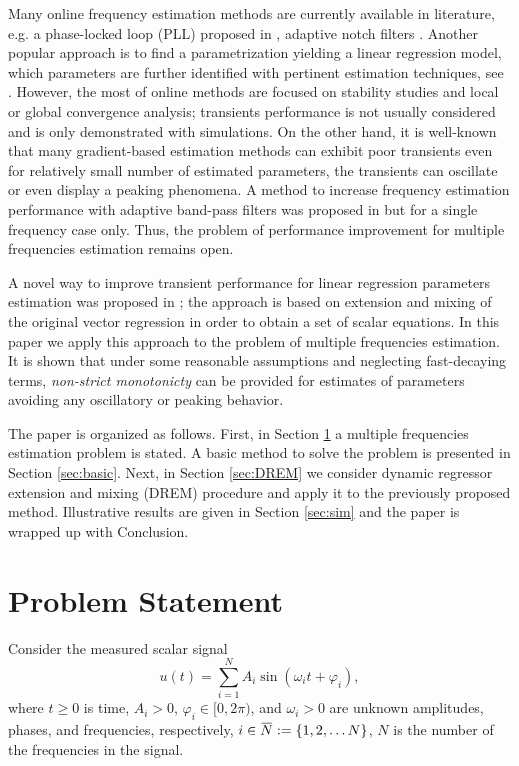 \documentclass[journal, onecolumn]{IEEEtran}
\newcommand{\overbar}[1]{\mkern 1.5mu\overline{\mkern-1.5mu#1\mkern-1.5mu}\mkern 1.5mu}
\newcommand{\iinb}{i\in\overbar{N}}
\begin{document}
Many online frequency estimation methods are currently available in literature, e.g. a phase-locked loop (PLL) proposed in \cite{wu2003magnitude}, adaptive notch filters \cite{regalia1991improved, mojiri2004adaptive}. Another popular approach is to find a parametrization yielding a linear regression model, which parameters are further identified with pertinent estimation techniques, see \cite{xia, chen2014robust, fedele2014frequency}. However, the most of online methods are focused on stability studies and local or global convergence analysis; transients performance is not usually considered and is only demonstrated with simulations. On the other hand, it is well-known that many gradient-based estimation methods can exhibit poor transients even for relatively small number of estimated parameters, the transients can oscillate or even display a peaking phenomena. A method to increase frequency estimation performance with adaptive band-pass filters was proposed in \cite{Aranovskiy2015Cascade} but for a single frequency case only. Thus, the problem of performance improvement for multiple frequencies estimation remains open.

A novel way to improve transient performance for linear regression parameters estimation was proposed in \cite{Aranovskiy2015DREM}; the approach is based on extension and mixing of the original vector regression in order to obtain a set of scalar equations. In this paper we apply this approach to the problem of multiple frequencies estimation. It is shown that under some reasonable assumptions and neglecting fast-decaying terms, \emph{non-strict monotonicty} can be provided for estimates of parameters avoiding any oscillatory or peaking behavior. 

The paper is organized as follows. First, in Section \ref{sec:PS} a multiple frequencies estimation problem is stated. A basic method to solve the problem is presented in Section \ref{sec:basic}. Next, in Section \ref{sec:DREM} we consider dynamic regressor extension and mixing (DREM) procedure and apply it to the previously proposed method. Illustrative results are given in Section \ref{sec:sim} and the paper is wrapped up with Conclusion.

\section{Problem Statement} \label{sec:PS}
Consider the measured scalar signal 
\begin{equation} \label{eq:u}
	u(t) = \sum_{i=1}^N{A_i \sin (\omega_i t + \varphi_i)},
\end{equation}
where $t\ge 0$ is time, $A_i>0$, $\varphi_i \in [0, 2\pi)$, and $\omega_i>0$ are unknown amplitudes, phases, and frequencies, respectively, $\iinb:=\{1, 2, \ldots N\}$, $N$ is the number of the frequencies in the signal. 
\end{document}
